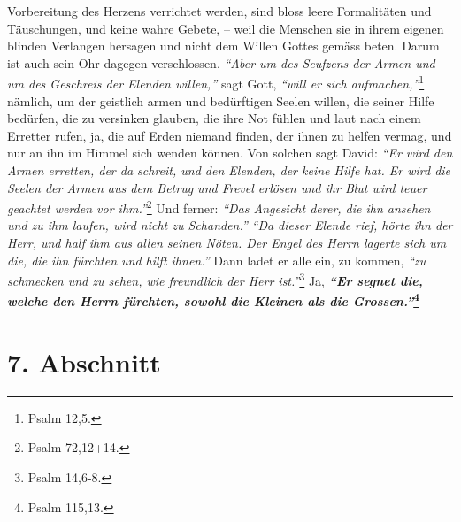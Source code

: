 Vorbereitung des Herzens verrichtet werden, sind bloss leere Formalitäten und
Täuschungen, und keine wahre Gebete, -- weil die Menschen sie in ihrem eigenen
blinden Verlangen hersagen und nicht dem Willen Gottes
gemäss beten. Darum ist
auch sein Ohr dagegen verschlossen.
\textit{"`Aber um des Seufzens der Armen und um des Geschreis der Elenden
willen,"'}
sagt Gott,
\textit{"`will er sich aufmachen,"'}\footnote{Psalm 12,5.}
nämlich, um der geistlich armen und bedürftigen
Seelen willen, die seiner Hilfe bedürfen, die zu versinken glauben, die ihre
Not fühlen und laut nach einem Erretter rufen, ja, die auf Erden niemand
finden, der ihnen zu helfen vermag, und nur an ihn im Himmel sich wenden
können. Von solchen sagt David:
\textit{"`Er wird den Armen erretten, der da schreit,
und den Elenden, der keine Hilfe hat. Er wird die Seelen der Armen aus dem
Betrug und Frevel erlösen und ihr Blut wird teuer geachtet werden vor
ihm."'}\footnote{Psalm 72,12+14.}
Und ferner:
\textit{"`Das Angesicht derer, die ihn ansehen und zu ihm laufen, wird nicht zu
Schanden."'}
\textit{"`Da dieser Elende rief, hörte ihn der Herr, und half ihm aus allen
seinen Nöten. Der Engel des Herrn lagerte sich um die, die ihn fürchten und
hilft ihnen."'}
Dann ladet er alle ein, zu kommen,
\textit{"`zu schmecken und zu sehen, wie freundlich der Herr
ist."'}\footnote{Psalm 14,6-8.}
Ja, \textbf{\textit{"`Er segnet die, welche den Herrn fürchten,
sowohl die Kleinen als
die Grossen."'}\footnote{Psalm 115,13.}}

\section{7. Abschnitt} \label{kap6_ab7}


